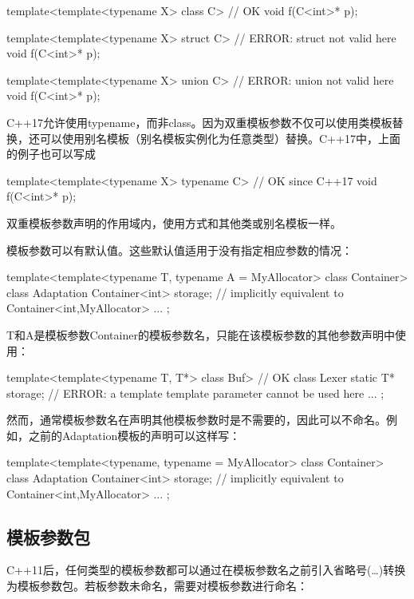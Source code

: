 \begin{cpp}
template<template<typename X> class C> // OK
void f(C<int>* p);

template<template<typename X> struct C> // ERROR: struct not valid here
void f(C<int>* p);

template<template<typename X> union C> // ERROR: union not valid here
void f(C<int>* p);
\end{cpp}

C++17允许使用typename，而非class。因为双重模板参数不仅可以使用类模板替换，还可以使用别名模板（别名模板实例化为任意类型）替换。C++17中，上面的例子也可以写成

\begin{cpp}
template<template<typename X> typename C> // OK since C++17
void f(C<int>* p);
\end{cpp}

双重模板参数声明的作用域内，使用方式和其他类或别名模板一样。

模板参数可以有默认值。这些默认值适用于没有指定相应参数的情况：

\begin{cpp}
template<template<typename T,
				  typename A = MyAllocator> class Container>
class Adaptation {
	Container<int> storage; // implicitly equivalent to Container<int,MyAllocator>
	...
};
\end{cpp}

T和A是模板参数Container的模板参数名，只能在该模板参数的其他参数声明中使用：

\begin{cpp}
template<template<typename T, T*> class Buf> // OK
class Lexer {
	static T* storage; // ERROR: a template template parameter cannot be used here
	...
};
\end{cpp}

然而，通常模板参数名在声明其他模板参数时是不需要的，因此可以不命名。例如，之前的Adaptation模板的声明可以这样写：

\begin{cpp}
template<template<typename,
				  typename = MyAllocator> class Container>
class Adaptation {
	Container<int> storage; // implicitly equivalent to Container<int,MyAllocator>
	...
};
\end{cpp}

\subsection{模板参数包}

C++11后，任何类型的模板参数都可以通过在模板参数名之前引入省略号(…)转换为模板参数包。若板参数未命名，需要对模板参数进行命名：

